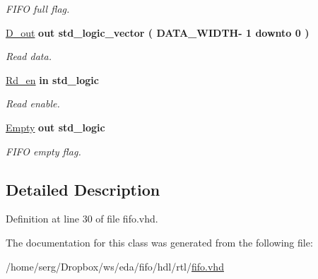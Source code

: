 \begin{DoxyCompactItemize}
\begin{DoxyCompactList}\small\item\em F\+I\+FO full flag. \end{DoxyCompactList}\item 
\hyperlink{classfifo_a40e0b7696a2a1a0133e5c4618a2bd812}{D\+\_\+out}  {\bfseries {\bfseries \textcolor{keywordflow}{out}\textcolor{vhdlchar}{ }}} {\bfseries \textcolor{comment}{std\+\_\+logic\+\_\+vector}\textcolor{vhdlchar}{ }\textcolor{vhdlchar}{(}\textcolor{vhdlchar}{ }\textcolor{vhdlchar}{ }\textcolor{vhdlchar}{ }\textcolor{vhdlchar}{ }\textcolor{vhdlchar}{D\+A\+T\+A\+\_\+\+W\+I\+D\+TH}\textcolor{vhdlchar}{-\/}\textcolor{vhdlchar}{ } \textcolor{vhdldigit}{1} \textcolor{vhdlchar}{ }\textcolor{keywordflow}{downto}\textcolor{vhdlchar}{ }\textcolor{vhdlchar}{ } \textcolor{vhdldigit}{0} \textcolor{vhdlchar}{ }\textcolor{vhdlchar}{)}\textcolor{vhdlchar}{ }} \hypertarget{classfifo_a40e0b7696a2a1a0133e5c4618a2bd812}{}\label{classfifo_a40e0b7696a2a1a0133e5c4618a2bd812}

\begin{DoxyCompactList}\small\item\em Read data. \end{DoxyCompactList}\item 
\hyperlink{classfifo_a42c3e76b43851615dbbab69bb46ed948}{Rd\+\_\+en}  {\bfseries {\bfseries \textcolor{keywordflow}{in}\textcolor{vhdlchar}{ }}} {\bfseries \textcolor{comment}{std\+\_\+logic}\textcolor{vhdlchar}{ }} \hypertarget{classfifo_a42c3e76b43851615dbbab69bb46ed948}{}\label{classfifo_a42c3e76b43851615dbbab69bb46ed948}

\begin{DoxyCompactList}\small\item\em Read enable. \end{DoxyCompactList}\item 
\hyperlink{classfifo_af6881da6e6a60e78a62835daa5690472}{Empty}  {\bfseries {\bfseries \textcolor{keywordflow}{out}\textcolor{vhdlchar}{ }}} {\bfseries \textcolor{comment}{std\+\_\+logic}\textcolor{vhdlchar}{ }} \hypertarget{classfifo_af6881da6e6a60e78a62835daa5690472}{}\label{classfifo_af6881da6e6a60e78a62835daa5690472}

\begin{DoxyCompactList}\small\item\em F\+I\+FO empty flag. \end{DoxyCompactList}\end{DoxyCompactItemize}


\subsection{Detailed Description}


Definition at line 30 of file fifo.\+vhd.



The documentation for this class was generated from the following file\+:\begin{DoxyCompactItemize}
\item 
/home/serg/\+Dropbox/ws/eda/fifo/hdl/rtl/\hyperlink{fifo_8vhd}{fifo.\+vhd}\end{DoxyCompactItemize}
